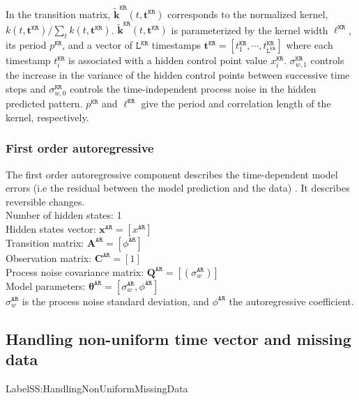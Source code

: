 \noindent
In the transition matrix, $\tilde{\bm k}^{\mathtt{KR}}(t,\mathbf{t}^{\mathtt{KR}})$ corresponds to the normalized kernel, $k(t,\mathbf{t}^{\mathtt{KR}})/\sum_{t} k(t,\mathbf{t}^{\mathtt{KR}})$. $\tilde{\bm k}^{\mathtt{KR}}(t,\mathbf{t}^{\mathtt{KR}})$ is parameterized by the kernel width $\ell^{\mathtt{KR}}$, its period $p^{\mathtt{KR}}$, and a vector of $\mathtt{L}^{\mathtt{KR}}$ timestamps $\mathbf{t}^{\mathtt{KR}}=[t_{1}^{\mathtt{KR}},\cdots,t_{\mathtt{L}^{\mathtt{KR}}}^{\mathtt{KR}}]$ where each timestamp $t_{i}^{\mathtt{KR}}$ is associated with a hidden control point value $x_{i}^{\mathtt{KR}}$. 
$\sigma_{w,1}^{\mathtt{KR}}$ controls the increase in the  variance of the hidden control points between successive time steps and $\sigma_{w,0}^{\mathtt{KR}}$ controls the time-independent process noise in the hidden predicted pattern.
$p^{\mathtt{KR}}$ and $\ell^{\mathtt{KR}}$ give the period and correlation length of the kernel, respectively.


\subsubsection{First order autoregressive}

The first order autoregressive component describes the time-dependent model errors (i.e the residual between the model prediction and the data) \cite{STC:STC2035}. 
It describes reversible changes.\\

\noindent
Number of hidden states: 1\\
Hidden states vector: $ \mathbf{x}^{\mathtt{AR}} = [x^{\mathtt{AR}}]$\\
Transition matrix: $\mathbf{A}^{\mathtt{AR}}=  [\phi^{\mathtt{AR}}]$\\
Observation matrix: $\mathbf{C}^{\mathtt{AR}}=[1]$\\
Process noise covariance matrix: $\mathbf{Q}^{\mathtt{AR}}=[(\sigma_{w}^{\mathtt{AR}})]$\\
Model parameters: $\bm\theta^{\mathtt{AR}}=[\sigma_{w}^{\mathtt{AR}}, \phi^{\mathtt{AR}} ]$\\

\noindent
$\sigma_{w}^{\mathtt{AR}}$ is the process noise standard deviation, and $\phi^{\mathtt{AR}}$ the autoregressive coefficient.

\subsection{Handling non-uniform time vector and missing data}
Label{SS:HandlingNonUniformMissingData}

